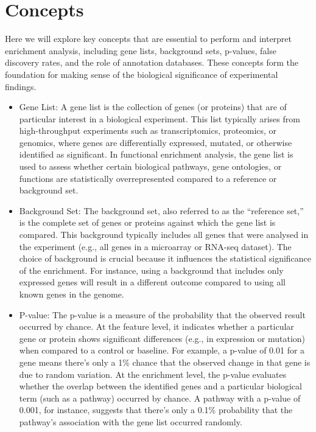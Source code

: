 \documentclass[
]{book}
\begin{document}
\hypertarget{concepts}{%
\section{Concepts}\label{concepts}}

Here we will explore key concepts that are essential to perform and interpret enrichment analysis, including gene lists, background sets, p-values, false discovery rates, and the role of annotation databases. These concepts form the foundation for making sense of the biological significance of experimental findings.

\begin{itemize}
\item
  {Gene List:}
  A gene list is the collection of genes (or proteins) that are of particular interest in a biological experiment. This list typically arises from high-throughput experiments such as transcriptomics, proteomics, or genomics, where genes are differentially expressed, mutated, or otherwise identified as significant. In functional enrichment analysis, the gene list is used to assess whether certain biological pathways, gene ontologies, or functions are statistically overrepresented compared to a reference or background set.
\item
  {Background Set:}
  The background set, also referred to as the ``reference set,'' is the complete set of genes or proteins against which the gene list is compared. This background typically includes all genes that were analysed in the experiment (e.g., all genes in a microarray or RNA-seq dataset). The choice of background is crucial because it influences the statistical significance of the enrichment. For instance, using a background that includes only expressed genes will result in a different outcome compared to using all known genes in the genome.
\item
  {P-value:}
  The p-value is a measure of the probability that the observed result occurred by chance. At the feature level, it indicates whether a particular gene or protein shows significant differences (e.g., in expression or mutation) when compared to a control or baseline. For example, a p-value of 0.01 for a gene means there's only a 1\% chance that the observed change in that gene is due to random variation. At the enrichment level, the p-value evaluates whether the overlap between the identified genes and a particular biological term (such as a pathway) occurred by chance. A pathway with a p-value of 0.001, for instance, suggests that there's only a 0.1\% probability that the pathway's association with the gene list occurred randomly.

\end{itemize}
\end{document}
